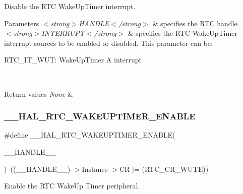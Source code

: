 Disable the R\+TC Wake\+Up\+Timer interrupt. 


\begin{DoxyParams}{Parameters}
{\em $<$strong$>$\+H\+A\+N\+D\+L\+E$<$/strong$>$} & specifies the R\+TC handle. \\
\hline
{\em $<$strong$>$\+I\+N\+T\+E\+R\+R\+U\+P\+T$<$/strong$>$} & specifies the R\+TC Wake\+Up\+Timer interrupt sources to be enabled or disabled. This parameter can be\+: \begin{DoxyItemize}
\item R\+T\+C\+\_\+\+I\+T\+\_\+\+W\+UT\+: Wake\+Up\+Timer A interrupt \end{DoxyItemize}
\\
\hline
\end{DoxyParams}

\begin{DoxyRetVals}{Return values}
{\em None} & \\
\hline
\end{DoxyRetVals}
\mbox{\label{group___r_t_c_ex___wake_up___timer_ga9b3ce87851ab95b1ab508b524a1055c8}} 
\subsubsection{\texorpdfstring{\+\_\+\+\_\+\+H\+A\+L\+\_\+\+R\+T\+C\+\_\+\+W\+A\+K\+E\+U\+P\+T\+I\+M\+E\+R\+\_\+\+E\+N\+A\+B\+LE}{\_\_HAL\_RTC\_WAKEUPTIMER\_ENABLE}}
{\footnotesize\ttfamily \#define \+\_\+\+\_\+\+H\+A\+L\+\_\+\+R\+T\+C\+\_\+\+W\+A\+K\+E\+U\+P\+T\+I\+M\+E\+R\+\_\+\+E\+N\+A\+B\+LE(\begin{DoxyParamCaption}\item[{}]{\+\_\+\+\_\+\+H\+A\+N\+D\+L\+E\+\_\+\+\_\+ }\end{DoxyParamCaption})~((\+\_\+\+\_\+\+H\+A\+N\+D\+L\+E\+\_\+\+\_\+)-\/$>$Instance-\/$>$CR $\vert$= (R\+T\+C\+\_\+\+C\+R\+\_\+\+W\+U\+TE))}



Enable the R\+TC Wake\+Up Timer peripheral. 


